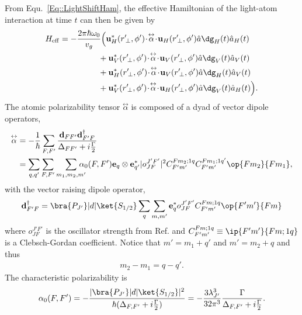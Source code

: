 \documentclass[]{report}
\newcommand{\tensor}[1]{\overset{\leftrightarrow}{#1}} %
\begin{document}
From Equ.~\eqref{Eq::LightShiftHam}, the effective Hamiltonian of the light-atom interaction at time $ t $ can then be given by
\begin{align}  
	H_{\rm eff}   = -\frac{2\pi \hbar \omega_0}{ v_g } &\Big( \mathbf{u}^*_H(r^\prime\!_\perp, \phi') 
	\!\cdot\! 
	\tensor{\alpha} \!\cdot\! \mathbf{u}_{H}(r^\prime\!_\perp, \phi') \hat{a}\dg_H(t) \hat{a}_H(t) \nonumber\\
	&\!\! +  
	\mathbf{u}^*_V(r^\prime\!_\perp, \phi')\! \cdot\! 
	\tensor{\alpha} \!\cdot\! \mathbf{u}_{V}(r^\prime\!_\perp, \phi') \hat{a}\dg_V(t) \hat{a}_V(t) \nonumber\\
	&\!\! + \mathbf{u}^*_H(r^\prime\!_\perp, \phi')\! \cdot\! \tensor{\alpha}\! \cdot\! 
	\mathbf{u}_{V}(r^\prime\!_\perp, \phi') \hat{a}\dg_H(t) \hat{a}_V(t) \nonumber\\
	&\!\! + \mathbf{u}^*_V(r^\prime\!_\perp, \phi') \!\cdot\! \tensor{\alpha}\! \cdot\! 
	\mathbf{u}_{H}(r^\prime\!_\perp, 
	\phi') \hat{a}\dg_V(t) \hat{a}_H(t) 
	\Big).  \label{eq:LightShiftHam_CG}
\end{align}
The atomic polarizability tensor $\tensor{\alpha}$ is composed of a dyad of vector dipole operators,    
\begin{align}
	\tensor{\alpha} & =  - \frac{1}{\hbar}  \sum_{F,F'} \frac{ \mathbf{d}_{FF'} \mathbf{d}^\dagger_{F'F} 
	}{\Delta_{FF'}+i\frac{\Gamma}{2} } \\
		& = \sum_{q,q'}  \sum_{F,F'} \sum_{m_1, m_2, m'} \!\!\!\!\!\! \alpha_0(F,F') \mathbf{e}_q \otimes 
		\mathbf{e}^*_{q'} | o^{J'F'}_{JF} |^2 C^{Fm_2;1q}_{F'm'} C^{Fm_1;1q'}_{F'm'} \op{F m_2}{F m_1},
\end{align}
with the vector raising  dipole operator,
\begin{align}
	\mathbf{d}^\dagger_{F'F} =  \bra{P_{J'}}| d |\ket{S_{1/2}} \sum_q \sum_{m,m'} \mathbf{e}_q^* 
	o^{J'F'}_{JF} C^{Fm;1q}_{F'm'} \op{F'm'}{Fm}
\end{align}
where $o^{J'F'}_{JF}$ is the oscillator strength from Ref. \cite{Deutsch2010a} and $C^{Fm;1q}_{F'm'} 
\equiv 
\ip{F'm'}{Fm;1q}$ is a Clebsch-Gordan coefficient. 
Notice that $m' = m_1 + q'$ and $m' = m_2 + q$ and thus
\begin{align}
	m_2 - m_1 = q-q'.
\end{align}
The characteristic polarizability is
\begin{align} \label{eq:CharacteristicPolarizability}
	\alpha_0(F,F') = - \frac{ |\bra{P_{J'}}| d |\ket{S_{1/2}}|^2 }{\hbar (\Delta_{F,F'}+i\frac{\Gamma}{2})} = - 
	\frac{3 
	\lambda_{J'}^3}{32 \pi^3} \frac{\Gamma}{\Delta_{F,F'}+i\frac{\Gamma}{2}}.
\end{align}
\end{document}
